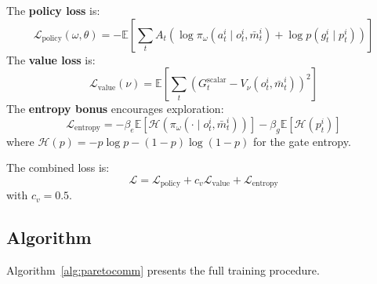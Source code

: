 \documentclass[runningheads]{llncs}
\newcommand{\E}{\mathbb{E}}
\begin{document}
The \textbf{policy loss} is:
\begin{equation}
  \mathcal{L}_\text{policy}(\omega, \theta) =
  -\E\!\left[\sum_t A_t \left(\log \pi_\omega(a^i_t \mid o^i_t, \bar{m}^i_t)
    + \log p(g^i_t \mid p^i_t)\right)\right]
  \label{eq:policy_loss}
\end{equation}
The \textbf{value loss} is:
\begin{equation}
  \mathcal{L}_\text{value}(\nu) =
  \E\!\left[\sum_t \left(G^\text{scalar}_t - V_\nu(o^i_t, \bar{m}^i_t)\right)^2\right]
  \label{eq:value_loss}
\end{equation}
The \textbf{entropy bonus} encourages exploration:
\begin{equation}
  \mathcal{L}_\text{entropy} =
  -\beta_e \E\!\left[\mathcal{H}(\pi_\omega(\cdot \mid o^i_t, \bar{m}^i_t))\right]
  - \beta_g \E\!\left[\mathcal{H}(p^i_t)\right]
  \label{eq:entropy_loss}
\end{equation}
where $\mathcal{H}(p) = -p\log p - (1-p)\log(1-p)$ for the gate entropy.

The combined loss is:
\begin{equation}
  \mathcal{L} = \mathcal{L}_\text{policy} + c_v \mathcal{L}_\text{value}
    + \mathcal{L}_\text{entropy}
  \label{eq:total_loss}
\end{equation}
with $c_v = 0.5$.

\subsection{Algorithm}

Algorithm~\ref{alg:paretocomm} presents the full training procedure.
\end{document}
